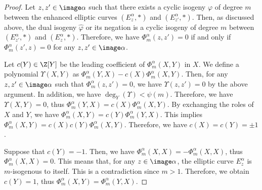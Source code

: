 \documentclass{amsart}
\theoremstyle{definition}
\theoremstyle{remark}
\numberwithin{equation}{section}
\begin{document}
\begin{proof}
    Let $z, z' \in \image \alpha$ such that
    there exists a cyclic isogeny $\varphi$ of degree $m$
    between the enhanced elliptic curves
    $(E_z^\alpha, \ast)$ and $(E_{z'}^\alpha, \ast)$.
    Then, as discussed above,
    the dual isogeny $\hat{\varphi}$ or its negation
    is a cyclic isogeny of degree $m$
    between $(E_{z'}^\alpha, \ast)$ and $(E_z^\alpha, \ast)$.
    Therefore, we have $\Phi_m^{\alpha}(z, z') = 0$
    if and only if $\Phi_m^{\alpha}(z', z) = 0$
    for any $z, z' \in \image \alpha$.

    Let $c(Y) \in \Z[Y]$ be the leading coefficient of $\Phi_m^{\alpha}(X, Y)$ in $X$.
    We define a polynomial $\Upsilon(X, Y)$ as $\Phi_m^\alpha(Y, X) - c(X)\Phi_m^{\alpha}(X, Y)$.
    Then, for any $z, z' \in \image \alpha$ such that $\Phi_m^{\alpha}(z, z') = 0$,
    we have $\Upsilon(z, z') = 0$ by the above argument.
    In addition, we have $\deg_Y(\Upsilon) < \psi(m)$.
    Therefore, we have $\Upsilon(X, Y) = 0$,
    thus $\Phi_m^{\alpha}(Y, X) = c(X) \Phi_m^{\alpha}(X, Y)$.
    By exchanging the roles of $X$ and $Y$,
    we have $\Phi_m^{\alpha}(X, Y) = c(Y) \Phi_m^{\alpha}(Y, X)$.
    This implies $\Phi_m^{\alpha}(X, Y) = c(X) c(Y) \Phi_m^{\alpha}(X, Y)$.
    Therefore, we have $c(X) = c(Y) = \pm 1$.
    
    Suppose that $c(Y) = -1$.
    Then, we have $\Phi_m^{\alpha}(X, X) = -\Phi_m^{\alpha}(X, X)$,
    thus $\Phi_m^{\alpha}(X, X) = 0$.
    This means that,
    for any $z \in \image \alpha$,
    the elliptic curve $E_z^\alpha$ is $m$-isogenous to itself.
    This is a contradiction since $m > 1$.
    Therefore, we obtain $c(Y) = 1$,
    thus $\Phi_m^{\alpha}(X, Y) = \Phi_m^{\alpha}(Y, X)$.
\end{proof}
\end{document}
